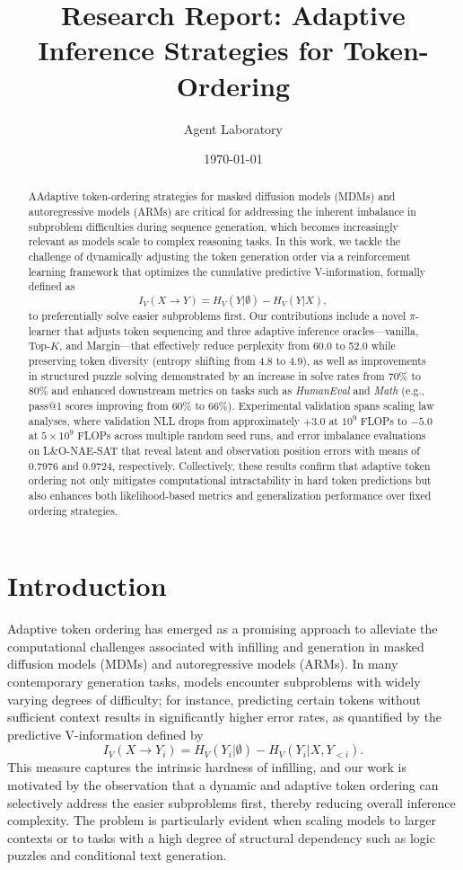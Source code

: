 \documentclass{article} %
\title{Research Report: Adaptive Inference Strategies for Token-Ordering}
\author{Agent Laboratory}
\date{\today}
\begin{document}
\maketitle

\begin{abstract}
AAdaptive token-ordering strategies for masked diffusion models (MDMs) and autoregressive models (ARMs) are critical for addressing the inherent imbalance in subproblem difficulties during sequence generation, which becomes increasingly relevant as models scale to complex reasoning tasks. In this work, we tackle the challenge of dynamically adjusting the token generation order via a reinforcement learning framework that optimizes the cumulative predictive V-information, formally defined as
\[
I_V(X \to Y) = H_V(Y|\emptyset) - H_V(Y|X),
\]
to preferentially solve easier subproblems first. Our contributions include a novel \(\pi\)-learner that adjusts token sequencing and three adaptive inference oracles—vanilla, Top-\(K\), and Margin—that effectively reduce perplexity from 60.0 to 52.0 while preserving token diversity (entropy shifting from 4.8 to 4.9), as well as improvements in structured puzzle solving demonstrated by an increase in solve rates from 70\% to 80\% and enhanced downstream metrics on tasks such as \textit{HumanEval} and \textit{Math} (e.g., pass@1 scores improving from 60\% to 66\%). Experimental validation spans scaling law analyses, where validation NLL drops from approximately \(+3.0\) at \(10^9\) FLOPs to \(-5.0\) at \(5\times10^9\) FLOPs across multiple random seed runs, and error imbalance evaluations on L\&O-NAE-SAT that reveal latent and observation position errors with means of 0.7976 and 0.9724, respectively. Collectively, these results confirm that adaptive token ordering not only mitigates computational intractability in hard token predictions but also enhances both likelihood-based metrics and generalization performance over fixed ordering strategies.

\end{abstract}

\section{Introduction}
Adaptive token ordering has emerged as a promising approach to alleviate the computational challenges associated with infilling and generation in masked diffusion models (MDMs) and autoregressive models (ARMs). In many contemporary generation tasks, models encounter subproblems with widely varying degrees of difficulty; for instance, predicting certain tokens without sufficient context results in significantly higher error rates, as quantified by the predictive V-information defined by 
\[
I_V(X \to Y_i) = H_V(Y_i|\emptyset) - H_V(Y_i|X, Y_{<i}).
\]
This measure captures the intrinsic hardness of infilling, and our work is motivated by the observation that a dynamic and adaptive token ordering can selectively address the easier subproblems first, thereby reducing overall inference complexity. The problem is particularly evident when scaling models to larger contexts or to tasks with a high degree of structural dependency such as logic puzzles and conditional text generation.
\end{document}
